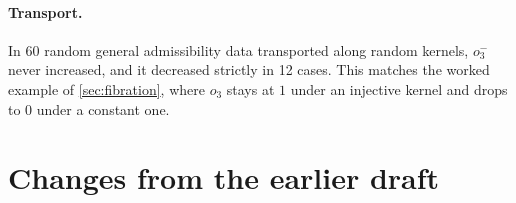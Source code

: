 \documentclass[11pt]{article}
\theoremstyle{definition}
\theoremstyle{remark}
\begin{document}
\paragraph{Transport.} In 60 random general admissibility data transported along random kernels, $o_3^-$ never increased,
and it decreased strictly in 12 cases. This matches the worked example of \cref{sec:fibration}, where $o_3$ stays at $1$
under an injective kernel and drops to $0$ under a constant one.

\appendix
\section{Changes from the earlier draft}\label{app:changes}
\end{document}
